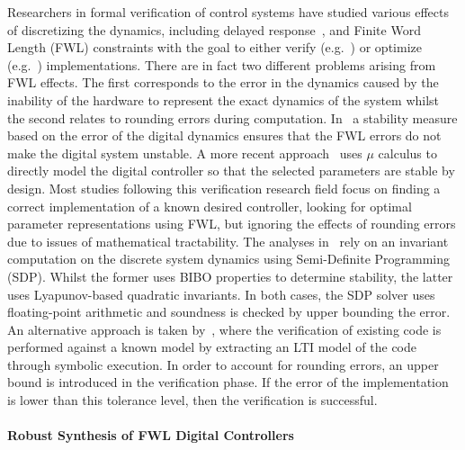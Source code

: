\documentclass{sig-alternate-05-2015}
\begin{document}
Researchers in formal verification of control systems have studied various
effects of discretizing the dynamics, including delayed
response~\cite{Duggirala2015}, and Finite Word Length (FWL) constraints with
the goal to either verify (e.g.~\cite{daes20161}) or optimize
(e.g.~\cite{oudjida2014design}) implementations.  There are in fact two
different problems arising from FWL effects.  The first corresponds to the
error in the dynamics caused by the inability of the hardware to represent
the exact dynamics of the system whilst the second relates to rounding
errors during computation.  In~\cite{fialho1994stability} a stability
measure based on the error of the digital dynamics ensures that the FWL
errors do not make the digital system unstable.  A more recent
approach~\cite{DBLP:journals/automatica/WuLCC09} uses $\mu$ calculus to
directly model the digital controller so that the selected parameters are
stable by design.  Most studies following this verification research field
focus on finding a correct implementation of a known desired controller,
looking for optimal parameter representations using FWL, but ignoring the
effects of rounding errors due to issues of mathematical tractability.  The
analyses in~\cite{DBLP:conf/hybrid/WangGRJF16, DBLP:conf/hybrid/RouxJG15}
rely on an invariant computation on the discrete system dynamics using
Semi-Definite Programming (SDP).  Whilst the former uses BIBO properties to
determine stability, the latter uses Lyapunov-based quadratic invariants. 
In both cases, the SDP solver uses floating-point arithmetic and soundness
is checked by upper bounding the error.  An alternative approach is taken
by~\cite{park2016scalable}, where the verification of existing code is
performed against a known model by extracting an LTI model of the code
through symbolic execution.  In order to account for rounding errors, an
upper bound is introduced in the verification phase.  If the error of the
implementation is lower than this tolerance level, then the verification is
successful.

\paragraph{Robust Synthesis of FWL Digital Controllers}
\end{document}
